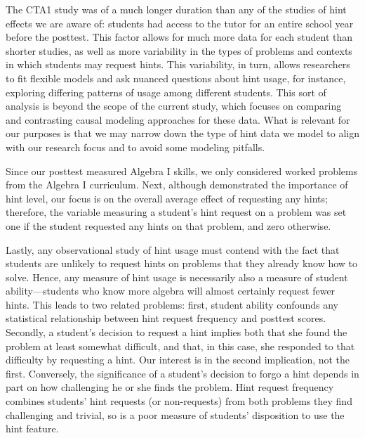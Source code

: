 \documentclass{article}\usepackage[]{graphicx}\usepackage[]{color}
\begin{document}
The CTA1 study was of a much longer duration than
any of the studies of hint effects we are aware of: students had access to the tutor for an entire
school year before the posttest.
This factor allows for much more data for each student than shorter
studies, as well as more variability in the types of problems and
contexts in which students may request hints.
This variability, in turn, allows researchers to fit flexible models
and ask nuanced questions about hint usage, for instance, exploring differing
patterns of usage among different students.
This sort of analysis is beyond the scope of the current study, which
focuses on comparing and contrasting causal modeling approaches for
these data.
What is relevant for our purposes is that we may narrow down the type
of hint data we model to align with our research focus and to avoid
some modeling pitfalls.

Since our posttest measured Algebra I skills, we only
considered worked problems from the Algebra I curriculum.
Next, although \citet{goldin2012learner} demonstrated the importance
of hint level, our focus is on the overall average effect of
requesting any hints; therefore, the variable measuring a student's
hint request on a problem was set one if the student requested any
hints on that problem, and zero otherwise.

Lastly, any observational study of hint usage must contend with the
fact that students are unlikely to request hints on problems that they
already know how to solve.
Hence, any measure of hint usage is necessarily also a measure of
student ability---students who know more algebra will almost certainly
request fewer hints.
This leads to two related problems: first, student ability
confounds any statistical relationship between hint request frequency
and posttest scores.
Secondly,
a student's decision to request a hint implies both that she
found the problem at least somewhat difficult, and that, in this case,
she responded to that difficulty by requesting a hint.
Our interest is in the second implication, not the first.
Conversely, the significance of a student's decision to forgo a hint
depends in part on how challenging he or she finds the problem.
Hint request frequency combines students' hint requests (or non-requests) from both
problems they find challenging and trivial, so is a poor measure of
students' disposition to use the hint feature.
\end{document}
